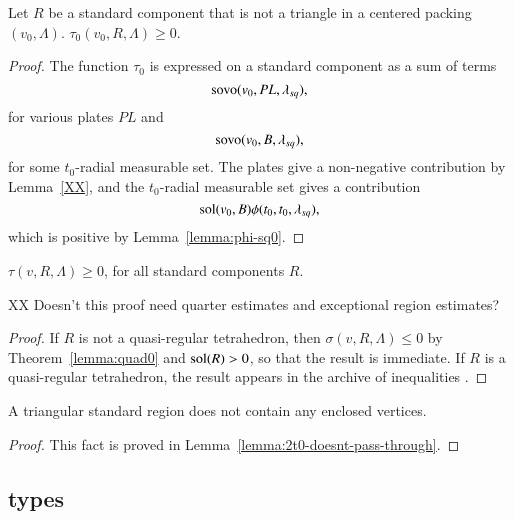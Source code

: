 
\begin{lemma}
    \label{lemma:tau-positive}
    Let $R$ be a standard component that is not a triangle in a
    centered packing $(v_0,\Lambda)$.
    $\tau_{0}(v_0,R,\Lambda)\ge 0$.
\end{lemma}

\begin{proof}
The function $\tau_0$ is expressed on a standard component as a sum
of terms
  $$
  {\operatorname{sovo}}(v_0,PL,\lambda_{sq}),
  $$
for various plates $PL$ and
   $$
   {\operatorname{sovo}}(v_0,B,\lambda_{sq}),
   $$
for some $t_0$-radial measurable set.  %
The plates give a non-negative contribution by Lemma~\ref{XX},
and the $t_0$-radial measurable set gives a contribution
   $$
   \operatorname{sol}(v_0,B)\phi(t_0,t_0,\lambda_{sq}),
   $$
which is positive by Lemma~\ref{lemma:phi-sq0}.
\end{proof}


\begin{lemma}\label{lemma:roger0}
    $\tau(v,R,\Lambda)\ge 0$, for all standard components $R$.
\end{lemma}

XX Doesn't this proof need quarter estimates and exceptional region
estimates?

\begin{proof}
If $R$ is not a quasi-regular tetrahedron, then $\sigma(v,R,\Lambda)\le0$
by Theorem~\ref{lemma:quad0} and $\operatorname{sol}(R)> 0$, so that the result
is immediate. If $R$ is a quasi-regular tetrahedron, the result
appears in the archive of inequalities .
\end{proof}



\begin{lemma}
        \label{lemma:no-enclosed-tri}
        A triangular standard region does not contain any enclosed
        vertices.
\end{lemma}

\begin{proof}
    This fact is proved in Lemma~\ref{lemma:2t0-doesnt-pass-through}.
\end{proof}





\subsection{types}\label{sec:types}%

